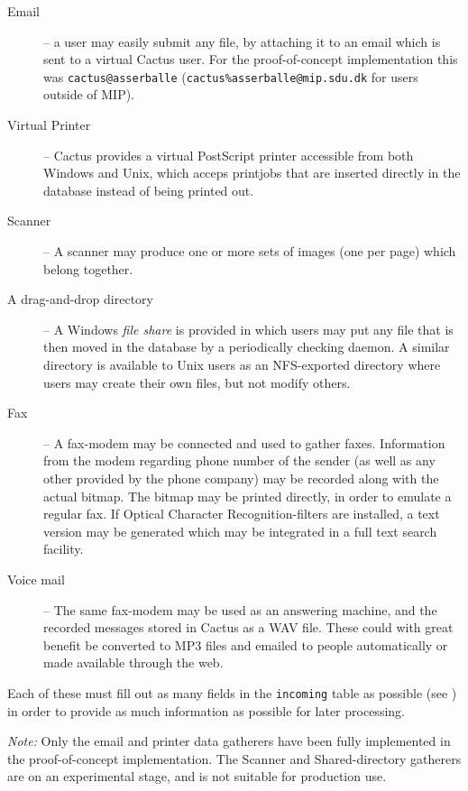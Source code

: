 \begin{description}
\item[Email] -- a user may easily submit any file, by
  attaching it to an email which is sent to a virtual Cactus
  user.  For the proof-of-concept implementation this was
  \texttt{cactus@asserballe}
  (\texttt{cactus\%asserballe@mip.sdu.dk} for users outside
  of MIP).

\item[Virtual Printer] -- Cactus provides a virtual
  PostScript printer accessible from both Windows and Unix,
  which acceps printjobs that are inserted directly in the
  database instead of being printed out.

\item[Scanner] -- A scanner may produce one or more sets of
  images (one per page) which belong together.

\item[A drag-and-drop directory] -- A Windows \textit{file
    share} is provided in which users may put any file that
  is then moved in the database by a periodically checking
  daemon.  A similar directory is available to Unix users as
  an NFS-exported directory where users may create their own
  files, but not modify others.


\item[Fax] -- A fax-modem may be connected and used to
  gather faxes.  Information from the modem regarding phone
  number of the sender (as well as any other provided by the
  phone company) may be recorded along with the actual
  bitmap.  The bitmap may be printed directly, in order to
  emulate a regular fax.  If Optical Character
  Recognition-filters are installed, a text version may be
  generated which may be integrated in a full text search
  facility.

\item[Voice mail] -- The same fax-modem may be used as an answering
machine, and the recorded messages stored in Cactus as a WAV file.
These could with great benefit be converted to MP3 files and emailed
to people automatically or made available through the web.

\end{description}

Each of these must fill out as many fields in the
\texttt{incoming} table as possible (see
) in order to provide as much
information as possible for later processing.

\textit{Note:} Only the email and printer data gatherers
have been fully implemented in the proof-of-concept
implementation.  The Scanner and Shared-directory gatherers
are on an experimental stage, and is not suitable for
production use.


